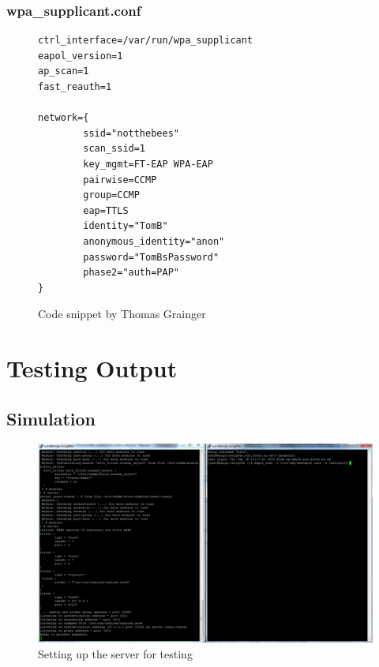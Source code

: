 \documentclass[12pt,a4paper,titlepage]{article}
\begin{document}
\subsubsection{wpa\_supplicant.conf}
\begin{figure}[h!]
\begin{Verbatim}[frame=single]
ctrl_interface=/var/run/wpa_supplicant
eapol_version=1
ap_scan=1
fast_reauth=1

network={
        ssid="notthebees"
        scan_ssid=1
        key_mgmt=FT-EAP WPA-EAP
        pairwise=CCMP
        group=CCMP
        eap=TTLS
        identity="TomB"
        anonymous_identity="anon"
        password="TomBsPassword"
        phase2="auth=PAP"
}
\end{Verbatim}
\caption{Code snippet by Thomas Grainger}
\end{figure}

\newpage
\section{Testing Output}

\subsection{Simulation}
\label{sec:testing-output;sub:simulation}
\begin{figure}[h!]
\centering
\includegraphics[scale=0.3]{./images/simulation/test1.png}
\caption{Setting up the server for testing}
\end{figure}
\end{document}
